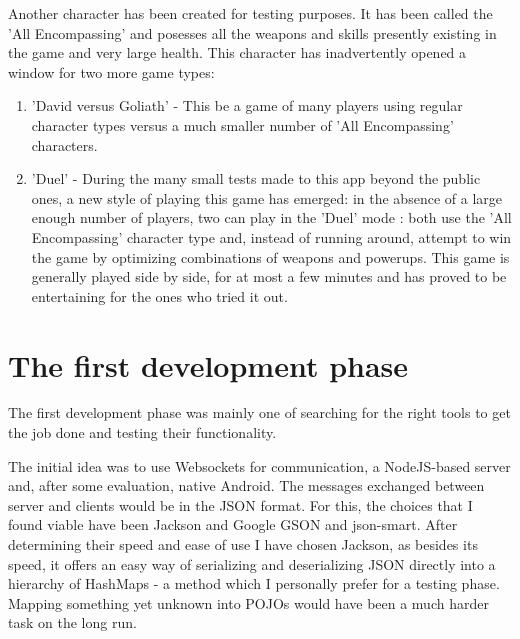 \documentclass{article}
\begin{document}
Another character has been created for testing purposes. It has been called the
'All Encompassing' and posesses all the weapons and skills presently existing in
the game and very large health. This character has inadvertently opened a window
for two more game types: 
\begin{enumerate}
  \item 'David versus Goliath' - This be a game of many players using regular
  character types versus a much smaller number of 'All Encompassing' characters.
  \item 'Duel' - During the many small tests made to this app beyond the public
  ones, a new style of playing this game has emerged: in the absence of a large
  enough number of players, two can play in the 'Duel' mode : both use the 'All
  Encompassing' character type and, instead of running around, attempt to win
  the game by optimizing combinations of weapons and powerups. This game is
  generally played side by side, for at most a few minutes and has proved to be
  entertaining for the ones who tried it out.
\end{enumerate}



\section{The first development phase}

The first development phase was mainly one of searching for the right tools to
get the job done and testing their functionality.\newline

The initial idea was to use Websockets for communication, a NodeJS-based server
and, after some evaluation, native Android. The messages exchanged between
server and clients would be in the JSON format. For this, the choices that I
found viable have been Jackson and Google GSON and json-smart. After determining
their speed and ease of use I have chosen Jackson, as besides its speed, it
offers an easy way of serializing and deserializing JSON directly into a
hierarchy of HashMaps - a method which I personally prefer for a testing phase.
Mapping something yet unknown into POJOs would have been a much harder task on
the long run.\newline
\end{document}
